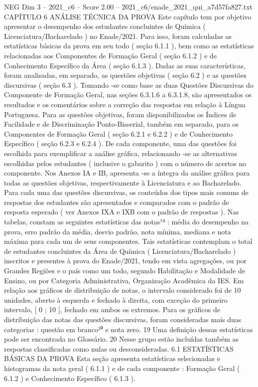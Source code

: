 \begin{textsample}{NEG Dim 3 – 2021\_c6 – Score 2.00 – 2021\_c6/enade\_2021\_qui\_a7d57fa827.txt}  \label{ex:f3_neg_240}
CAPÍTULO 6 ANÁLISE TÉCNICA DA PROVA Este capítulo tem por objetivo apresentar o desempenho dos estudantes concluintes de Química ( Licenciatura/Bacharelado ) no Enade/2021.
Para isso, foram calculadas as estatísticas básicas da prova em seu todo ( seção 6.1.1 ), bem como as estatísticas relacionadas aos Componentes de Formação Geral ( seção 6.1.2 ) e de Conhecimento Específico da Área ( seção 6.1.3 ).
Dadas as suas características, foram analisadas, em separado, as questões objetivas ( seção 6.2 ) e as questões discursivas ( seção 6.3 ).
Tomando -se como base as duas Questões Discursivas do Componente de Formação Geral, nas seções 6.3.1.6 a 6.3.1.8, são apresentados os resultados e os comentários sobre a correção das respostas em relação à Língua Portuguesa.
Para as questões objetivas, foram disponibilizados os Índices de Facilidade e de Discriminação Ponto-Bisserial, também em separado, para os Componentes de Formação Geral ( seção 6.2.1 e 6.2.2 ) e de Conhecimento Específico ( seção 6.2.3 e 6.2.4 ).
De cada componente, uma das questões foi escolhida para exemplificar a análise gráfica, relacionando -se as alternativas escolhidas pelos estudantes ( inclusive o gabarito ) com o número de acertos no componente.
Nos Anexos IA e IB, apresenta -se a íntegra da análise gráfica para todas as questões objetivas, respectivamente à Licenciatura e ao Bacharelado.
Para cada uma das questões discursivas, os conteúdos dos tipos mais comuns de respostas dos estudantes são apresentados e comparados com o padrão de resposta esperado ( ver Anexos IXA e IXB com o padrão de respostas ).
Nas tabelas, constam as seguintes estatísticas das notas¹⁹ : média do desempenho na prova, erro padrão da média, desvio padrão, nota mínima, mediana e nota máxima para cada um de seus componentes.
Tais estatísticas contemplam o total de estudantes concluintes da Área de Química ( Licenciatura/Bacharelado ) inscritos e presentes à prova do Enade/2021, tendo em vista agregações, ou por Grandes Regiões e o país como um todo, segundo Habilitação e Modalidade de Ensino, ou por Categoria Administrativa, Organização Acadêmica da IES.
Em relação aos gráficos de distribuição de notas, o intervalo considerado foi de 10 unidades, aberto à esquerda e fechado à direita, com exceção do primeiro intervalo, [ 0 ; 10 ], fechado em ambos os extremos.
Para os gráficos de distribuição das notas das questões discursivas, foram consideradas mais duas categorias : questão em branco²⁰ e nota zero. 19 Uma definição dessas estatísticas pode ser encontrada no Glossário. 20 Nesse grupo estão incluídas também as respostas classificadas como nulas ou desconsideradas. 6.1 ESTATÍSTICAS BÁSICAS DA PROVA Esta seção apresenta estatísticas selecionadas e histogramas da nota geral ( 6.1.1 ) e de cada componente : Formação Geral ( 6.1.2 ) e Conhecimento Específico ( 6.1.3 ).

\end{textsample}

